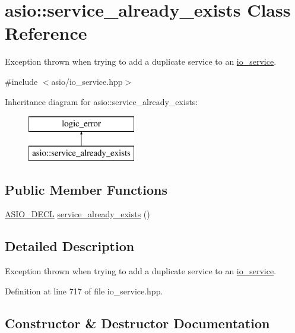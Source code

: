 \hypertarget{classasio_1_1service__already__exists}{}\section{asio\+:\+:service\+\_\+already\+\_\+exists Class Reference}
\label{classasio_1_1service__already__exists}


Exception thrown when trying to add a duplicate service to an \hyperlink{classasio_1_1io__service}{io\+\_\+service}.  




{\ttfamily \#include $<$asio/io\+\_\+service.\+hpp$>$}

Inheritance diagram for asio\+:\+:service\+\_\+already\+\_\+exists\+:\begin{figure}[H]
\begin{center}
\leavevmode
\includegraphics[height=2.000000cm]{classasio_1_1service__already__exists}
\end{center}
\end{figure}
\subsection*{Public Member Functions}
\begin{DoxyCompactItemize}
\item 
\hyperlink{config_8hpp_ab54d01ea04afeb9a8b39cfac467656b7}{A\+S\+I\+O\+\_\+\+D\+E\+C\+L} \hyperlink{classasio_1_1service__already__exists_ab25b77cfea1d716066f8000274fc5f01}{service\+\_\+already\+\_\+exists} ()
\end{DoxyCompactItemize}


\subsection{Detailed Description}
Exception thrown when trying to add a duplicate service to an \hyperlink{classasio_1_1io__service}{io\+\_\+service}. 

Definition at line 717 of file io\+\_\+service.\+hpp.



\subsection{Constructor \& Destructor Documentation}
\hypertarget{classasio_1_1service__already__exists_ab25b77cfea1d716066f8000274fc5f01}{}
